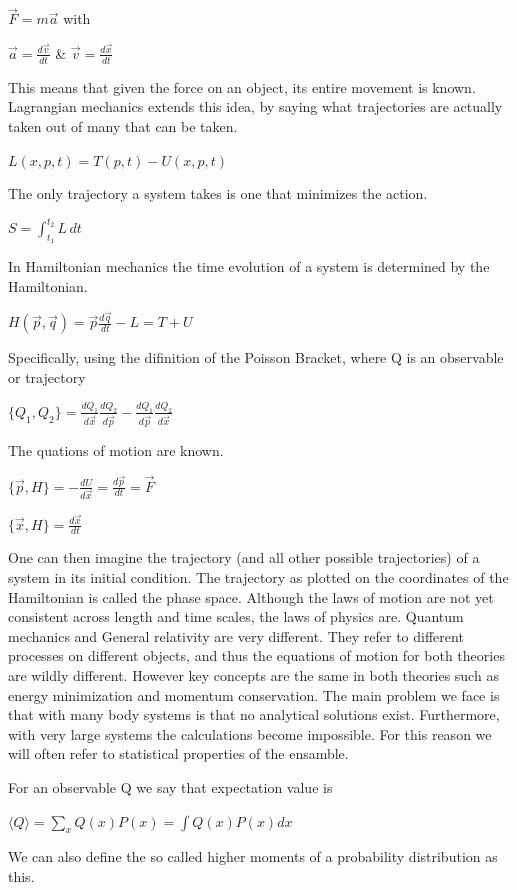 \documentclass[a4paper,11pt,oneside]{book}
\begin{document}
$\vec{F} = m\vec{a}$ with

$\vec{a} = \frac{d\vec{v}}{dt}$ \& $\vec{v} = \frac{d\vec{x}}{dt}$

This means that given the force on an object, its entire movement is known. Lagrangian mechanics extends this idea, by saying what trajectories are actually taken out of many that can be taken.

$L(x, p, t) = T(p, t) - U(x, p, t)$

The only trajectory a system takes is one that minimizes the action.

$S = \int_{t_1}^{t_2} L \, dt$

In Hamiltonian mechanics the time evolution of a system is determined by the Hamiltonian.

$H(\vec{p}, \vec{q}) = \vec{p} \frac{d\vec{q}}{dt} - L = T + U$

Specifically, using the difinition of the Poisson Bracket, where Q is an observable or trajectory

$\{Q_1, Q_2\} = \frac{dQ_1}{d\vec{x}} \frac{dQ_2}{d\vec{p}} - \frac{dQ_1}{d\vec{p}} \frac{dQ_2}{d\vec{x}}$

The quations of motion are known.

$\{\vec{p}, H\} = -\frac{dU}{d\vec{x}} = \frac{d\vec{p}}{dt} = \vec{F}$

$\{\vec{x}, H\} = \frac{d\vec{x}}{dt}$

One can then imagine the trajectory (and all other possible trajectories) of a system in its initial condition. The trajectory as plotted on the coordinates of the Hamiltonian is called the phase space. Although the laws of motion are not yet consistent across length and time scales, the laws of physics are. Quantum mechanics and General relativity are very different. They refer to different processes on different objects, and thus the equations of motion for both theories are wildly different. However key concepts are the same in both theories such as energy minimization and momentum conservation. The main problem we face is that with many body systems is that no analytical solutions exist. Furthermore, with very large systems the calculations become impossible. For this reason we will often refer to statistical properties of the ensamble.

For an observable Q we say that expectation value is

$\langle Q \rangle = \sum_x Q(x)P(x) = \int Q(x)P(x)dx$

We can also define the so called higher moments of a probability distribution as this.
\end{document}
